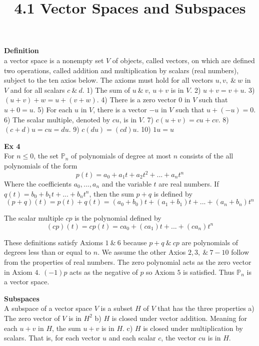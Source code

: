 \documentclass{article}
\title{4.1 Vector Spaces and Subspaces}
\begin{document}
    \maketitle
    \textbf{Definition}\\
    a vector space is a nonempty set $ V $ of objects, called vectors, on which are defined two operations, called addition and multiplication by scalars (real numbers), subject to the ten axios below. The axioms must hold for all vectors $ u,v, ~\&~ w $ in $ V $ and for all scalars $ c ~\&~ d $.
    1) The sum of $ u ~\&~ v $, $ u+v $ is in $ V $.
    2) $ u + v = v+ u $.
    3) $ (u+v) + w = u + (v+w) $.
    4) There is a zero vector $ 0 $ in $ V $ such that $ u + 0 =u $.
    5) For each $ u $ in $ V $, there is a vector $ -u $ in $ V $ such that $ u+(-u)=0 $. 
    6) The scalar multiple, denoted by $ cu $, is in $ V $.
    7) $ c(u+v)=cu+cv $.
    8) $ (c+d)u=cu=du $.
    9) $ c(du)=(cd)u $.
    10) $ 1u=u $ 

    \textbf{Ex 4}\\
    For $ n \le 0 $, the set $ \mathbb{P}_{n} $ of polynomials of degree at most $ n $ consists of the all polynomials of the form
    \[
        p(t)=a_{0}+a_{1}t+a_{2}t^{2}+...+a_{n}t^{n}      
    \]
    Where the coefficients $ a_{0},...,a_{n} $ and the variable $ t $ are real numbers. If $ q(t)=b_{0}+b_{1}t+...+b_{n}t^{n} $, then the sum $ p+q $ is defined by
    \[
      (p+q)(t)=p(t)+q(t)=(a_{0}+b_{0})t+(a_{1}+b_{1})t+...+(a_{n}+b_{n})t^{n} 
    \]

    The scalar multiple $ cp $ is the polynomial defined by
    \[
      (cp)(t)=cp(t)=ca_{0}+(ca_{1})t+...+(ca_{n})t^{n}  
    \]

    These definitions satisfy Axioms $ 1 ~\&~ 6 $ because $ p+q ~\&~ cp $ are polynomials of degrees less than or equal to $ n $. We assume the other Axios $ 2,3,~\&~ 7-10 $ follow from the properties of real numbers. The zero polynomial acts as the zero vector in Axiom $ 4 $. $ (-1)p $ acts as the negative of $ p $ so Axiom $ 5 $ is satisfied. Thus $ \mathbb{P}_{n} $ is a vector space.

    \textbf{Subspaces}\\
    A subspace of a vector space $ V $ is a subset $ H $ of $ V $ that has the three properties
    a) The zero vector of $ V $ is in $ H^{2} $
    b) $ H $ is closed under vector addition. Meaning for each $ u+v $ in $ H $, the sum $ u+v $ is in $ H $.
    c) $ H $ is closed under multiplication by scalars. That is, for each vector $ u $ and each scalar $ c $, the vector $ cu $ is in $ H $.
\end{document}
